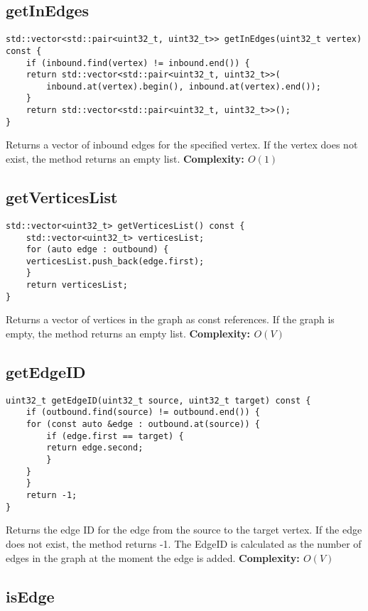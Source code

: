 \documentclass{article}
\begin{document}
\subsection*{getInEdges}

\begin{verbatim}
std::vector<std::pair<uint32_t, uint32_t>> getInEdges(uint32_t vertex) const {
    if (inbound.find(vertex) != inbound.end()) {
    return std::vector<std::pair<uint32_t, uint32_t>>(
        inbound.at(vertex).begin(), inbound.at(vertex).end());
    }
    return std::vector<std::pair<uint32_t, uint32_t>>();
}
\end{verbatim}
Returns a vector of inbound edges for the specified vertex. If the vertex does not exist, the method returns an empty list.
\textbf{Complexity: $O(1)$}

\subsection*{getVerticesList}

\begin{verbatim}
std::vector<uint32_t> getVerticesList() const {
    std::vector<uint32_t> verticesList;
    for (auto edge : outbound) {
    verticesList.push_back(edge.first);
    }
    return verticesList;
}
\end{verbatim}
Returns a vector of vertices in the graph as const references. If the graph is empty, the method returns an empty list.
\textbf{Complexity: $O(V)$}

\subsection*{getEdgeID}

\begin{verbatim}
uint32_t getEdgeID(uint32_t source, uint32_t target) const {
    if (outbound.find(source) != outbound.end()) {
    for (const auto &edge : outbound.at(source)) {
        if (edge.first == target) {
        return edge.second;
        }
    }
    }
    return -1;
}
\end{verbatim}
Returns the edge ID for the edge from the source to the target vertex. If the edge does not exist, the method returns -1. 
The EdgeID is calculated as the number of edges in the graph at the moment the edge is added.
\textbf{Complexity: $O(V)$}

\subsection*{isEdge}
\end{document}
